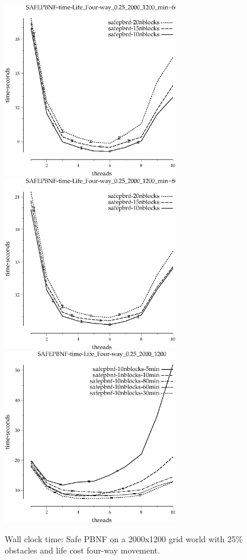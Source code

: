 \documentclass{article}
\begin{document}
\begin{appendices}
\begin{figure}[h]
\begin{center}
\includegraphics[width=3in]{../graphs/grid_life_four-way_0.25_2000_1200/SAFEPBNF-time-Life_Four-way_0.25_2000_1200_min=60.eps}
\includegraphics[width=3in]{../graphs/grid_life_four-way_0.25_2000_1200/SAFEPBNF-time-Life_Four-way_0.25_2000_1200_min=80.eps}
\includegraphics[width=3in]{../graphs/grid_life_four-way_0.25_2000_1200/SAFEPBNF-time-Life_Four-way_0.25_2000_1200.eps}
\caption{Wall clock time: Safe PBNF on a 2000x1200 grid world with 25\%
  obstacles and life cost four-way movement.}
\end{center}
\end{figure}


\end{appendices}
\end{document}
